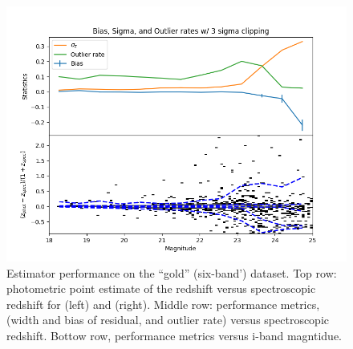 \begin{figure}
    \includegraphics[width=0.45\linewidth]{figures/biweight_stats_v_mag_knn.png}    
    \caption{Estimator performance on the ``gold'' (six-band') dataset.  Top row: photometric point estimate of the redshift versus spectroscopic redshift for  (left) and  (right).   Middle row: performance metrics, (width and bias of residual, and outlier rate) versus spectroscopic redshift.    Bottow row, performance metrics versus i-band magntidue.}
    \label{fig:perf_gold}
\end{figure}

